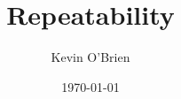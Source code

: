 \documentclass[12pt, a4paper]{article}
\begin{document}
\author{Kevin O'Brien}
\title{Repeatability}
\date{\today}
\maketitle
\tableofcontents



\end{document}
